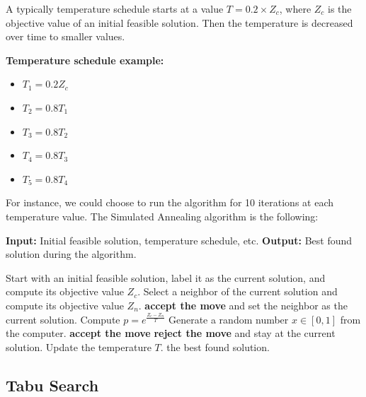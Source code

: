A typically temperature schedule starts at a value $T = 0.2 \times Z_c$, where $Z_c$ is the objective value of an initial feasible solution.  Then the temperature is decreased over time to smaller values.

\textbf{Temperature schedule example:}
\begin{itemize}
\item  $T_1 = 0.2 Z_c$
\item $T_2 = 0.8 T_1$
\item $T_3 = 0.8 T_2$
\item $T_4 = 0.8 T_3$
\item $T_5 = 0.8 T_4$
\end{itemize}
For instance, we could choose to run the algorithm for 10 iterations at each temperature value.  The Simulated Annealing algorithm is the following:
\begin{algorithm}
\caption{Simulated Annealing Outline [minimization version]}
\begin{algorithmic}[1]
    \State \textbf{Input:} Initial feasible solution, temperature schedule, etc.
    \State \textbf{Output:} Best found solution during the algorithm.

    \State Start with an initial feasible solution, label it as the current solution, and compute its objective value $Z_c$.
        \State Select a neighbor of the current solution and compute its objective value $Z_n$.
            \State \textbf{accept the move} and set the neighbor as the current solution.
        \Else
            \State Compute $p = e^{\frac{Z_c - Z_n}{T}}$
            \State Generate a random number $x \in [0,1]$ from the computer.
                \State \textbf{accept the move}
            \Else
                \State \textbf{reject the move} and stay at the current solution.
            \EndIf
        \EndIf
        \State Update the temperature $T$.
    \EndWhile
    \State \Return the best found solution.
\end{algorithmic}
\end{algorithm}


\subsection{Tabu Search}


